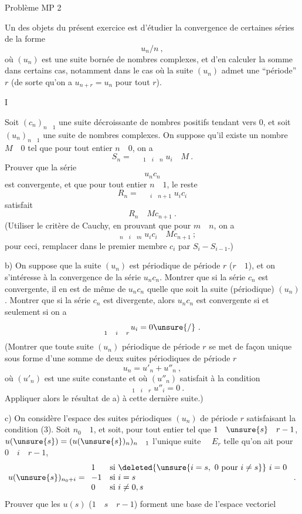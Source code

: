 \begin{center}Problème MP 2\end{center}

Un des objets du présent exercice est d'étudier la convergence de certaines séries de la forme
\[ u_n/n\ , \]
où $(u_n)$ est une suite bornée de nombres complexes, et d'en calculer la somme dans certains cas, notamment dans le cas où la suite $(u_n)$ admet une ``période'' $r$ (de sorte qu'on a $u_{n+r}=u_n$ pour tout $r$).

I

Soit $(c_n)_{n\quad1}$ une suite décroissante de nombres positifs tendant vers
$0$, et soit $(u_n)_{n\quad1}$ une suite de nombres complexes.  On suppose qu'il existe un nombre $M\quad0$ tel que pour tout entier $n\quad0$, on a
\[ S_n=\mathop{\quad}_{1\quad i\quad n}u_i\quad M\ . \]
 Prouver que la série
\[ u_nc_n \]
est convergente, et que pour tout entier $n\quad1$, le reste
\[ R_n=\mathop{\quad}_{i\quad n+1}u_ic_i \]
satisfait
\[ R_n\quad Mc_{n+1}\ . \]
(Utiliser le critère de Cauchy, en prouvant que pour $m\quad n$, on a
\[ \mathop{\quad}_{n\quad i\quad m}u_ic_i\quad Mc_{n+1}\ ; \]
pour ceci, remplacer dans le premier membre $c_i$ par $S_i-S_{i-1}$.)

b) On suppose que la suite $(u_n)$ est périodique de période $r$ ($r\quad1$), et on s'intéresse à la convergence de la série $u_nc_n$. Montrer que si la série $c_n$ est convergente, il en est de même de $u_nc_n$ quelle que soit la suite (périodique) $(u_n)$. Montrer que si la série $c_n$ est divergente, alors $u_nc_n$ est convergente si et seulement si on a
\[ \mathop{\quad}_{1\quad i\quad r}u_i=0\unsure{/}\ . \]
(Montrer que toute suite $(u_n)$ périodique de période $r$ se met de façon unique sous forme d'une somme de deux suites périodiques de période $r$
\[ u_n=u'_n+u''_n\ , \]
où $(u'_n)$ est une suite constante et où $(u''_n)$ satisfait à la condition
\[ \mathop{\quad}_{1\quad i\quad r}u''_i=0\ . \]
Appliquer alors le résultat de a) à cette dernière suite.)

c) On considère l'espace  des suites périodiques  $(u_n)$ de période $r$ satisfaisant la condition (3). Soit $n_0\quad1$, et soit, pour tout entier  tel que $1\quad\unsure{s}\quad r-1$, $u(\unsure{s})=(u(\unsure{s})_n)_{n\quad1}$ l'unique suite $\quad E_r$ telle qu'on ait
pour $0\quad i\quad r-1$,
\[
u(\unsure{s})_{n_0+i}=
\begin{array}{ll}
1&\text{si }\deleted{\unsure{i=s,\ 0\ \text{pour}\ i\ne s}}\ i=0\\
-1&\text{si }i=s\\
0&\text{si }i\ne0,s
\end{array}\ .
\]
Prouver que les $u(s)$ ($1\quad s\quad r-1$) forment une base de l'espace vectoriel

